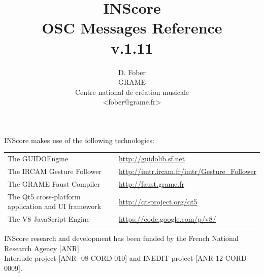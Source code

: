 \documentclass[a4paper,twoside]{report}
\begin{document}
\title{INScore \\ OSC Messages Reference \\v.1.11}

\author{D. Fober\\ GRAME\\ Centre national de cr\'eation musicale\\
{\small <fober@grame.fr>} \\
}

\maketitle

\vspace*{17cm}
 
{\small INScore makes use of the following technologies:}
\begin{table}[h]
\begin{tabular}{ll}
{\small The GUIDOEngine}  					& {\small \url{http://guidolib.sf.net}} \\
{\small The IRCAM Gesture Follower} 		& {\small \url{http://imtr.ircam.fr/imtr/Gesture_Follower}} \\
{\small The GRAME Faust Compiler} 		& {\small \url{http://faust.grame.fr}} \\
{\small The Qt5 cross-platform application and UI framework} & {\small \url{http://qt-project.org/qt5}} \\
{\small The V8 JavaScript Engine} 				& {\small \url{https://code.google.com/p/v8/}}
\end{tabular}
\end{table}%

{\small INScore research and development has been funded by the French National Research Agency [ANR]\\ Interlude project [ANR- 08-CORD-010] and INEDIT project [ANR-12-CORD-0009].}
  

\pagestyle{empty}
\cleardoublepage
\tableofcontents

\vspace*{9.5cm}

\noindent\hrulefill\par
\vspace*{5mm}
\noindent{}
\thispagestyle{empty}
\pagestyle{plain}
\end{document}

